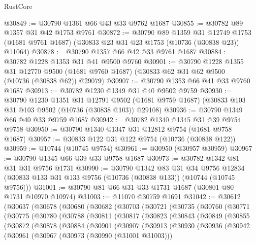 \begin{lexlean}{RustCore}
\begin{coremodule}
@30849 := @30790 @1361 @66 @43 @33 @9762 @1687
@30855 := @30782 @89 @1357 @31 @42 @1753 @9761
@30872 := @30790
    @89
    @1359
    @31
    @12749
    @1753
    (@1681 @9761 @1687)
    (@30833 @23 @31 @23 @1753 (@10736 (@30838 @23)) @11064)
@30878 := @30790 @1357 @66 @42 @33 @9761 @1687
@30884 := @30782 @1228 @1353 @31 @41 @9500 @9760
@30901 := @30790
    @1228
    @1355
    @31
    @12770
    @9500
    (@1681 @9760 @1687)
    (@30833 @62 @31 @62 @9500 (@10736 (@30838 @62)) @29079)
@30907 := @30790 @1353 @66 @41 @33 @9760 @1687
@30913 := @30782 @1230 @1349 @31 @40 @9502 @9759
@30930 := @30790
    @1230
    @1351
    @31
    @12791
    @9502
    (@1681 @9759 @1687)
    (@30833 @103 @31 @103 @9502 (@10736 (@30838 @103)) @29108)
@30936 := @30790 @1349 @66 @40 @33 @9759 @1687
@30942 := @30782 @1340 @1345 @31 @39 @9754 @9758
@30950 := @30790 @1340 @1347 @31 @12812 @9754 (@1681 @9758 @1687)
@30957 := @30833 @122 @31 @122 @9754 (@10736 (@30838 @122))
@30959 := @10744 (@10745 @9754)
@30961 := @30950 (@30957 @30959)
@30967 := @30790 @1345 @66 @39 @33 @9758 @1687
@30973 := @30782 @1342 @81 @31 @31 @9756 @1731
@30990 := @30790
    @1342
    @83
    @31
    @34
    @9756
    @12834
    (@30833 @133 @31 @133 @9756 (@10736 (@30838 @133)) (@10744 (@10745 @9756)))
@31001 := @30790 @81 @66 @31 @33 @1731 @1687 (@30801 @80 @1731 @10970 @10974)
@31003 := @11070 @30759 @1691
@31042 := @30612
    (@30637
      (@30678
        (@30680
          (@30682
            (@30703
              (@30721
                (@30735
                  (@30760
                    (@30771
                      (@30775
                        (@30780
                          (@30788
                            (@30811
                              (@30817
                                (@30823
                                  (@30843
                                    (@30849
                                      (@30855
                                        (@30872
                                          (@30878
                                            (@30884
                                              (@30901
                                                (@30907
                                                  (@30913
                                                    (@30930
                                                      (@30936
                                                        (@30942
                                                          (@30961
                                                            (@30967
                                                              (@30973 (@30990 (@31001 @31003)))

\end{coremodule}
\end{lexlean}
